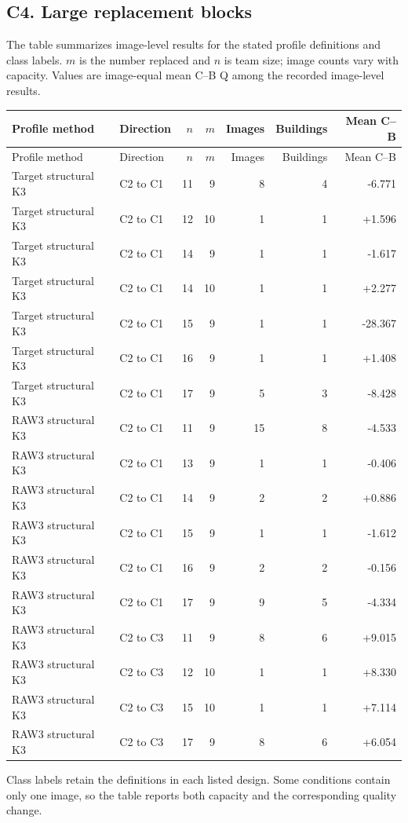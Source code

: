 \documentclass[10pt]{article}
\begin{document}
\subsection*{C4. Large replacement blocks}
The table summarizes image-level results for the stated profile definitions and class labels. $m$ is the number replaced and $n$ is team size; image counts vary with capacity. Values are image-equal mean C--B Q among the recorded image-level results.
\begin{longtable}{llrrrrr}
\toprule Profile method & Direction & $n$ & $m$ & Images & Buildings & Mean C--B \\
\midrule\endfirsthead\toprule Profile method & Direction & $n$ & $m$ & Images & Buildings & Mean C--B \\
\midrule\endhead
Target structural K3 & C2 to C1 & 11 & 9 & 8 & 4 & -6.771 \\
Target structural K3 & C2 to C1 & 12 & 10 & 1 & 1 & +1.596 \\
Target structural K3 & C2 to C1 & 14 & 9 & 1 & 1 & -1.617 \\
Target structural K3 & C2 to C1 & 14 & 10 & 1 & 1 & +2.277 \\
Target structural K3 & C2 to C1 & 15 & 9 & 1 & 1 & -28.367 \\
Target structural K3 & C2 to C1 & 16 & 9 & 1 & 1 & +1.408 \\
Target structural K3 & C2 to C1 & 17 & 9 & 5 & 3 & -8.428 \\
RAW3 structural K3 & C2 to C1 & 11 & 9 & 15 & 8 & -4.533 \\
RAW3 structural K3 & C2 to C1 & 13 & 9 & 1 & 1 & -0.406 \\
RAW3 structural K3 & C2 to C1 & 14 & 9 & 2 & 2 & +0.886 \\
RAW3 structural K3 & C2 to C1 & 15 & 9 & 1 & 1 & -1.612 \\
RAW3 structural K3 & C2 to C1 & 16 & 9 & 2 & 2 & -0.156 \\
RAW3 structural K3 & C2 to C1 & 17 & 9 & 9 & 5 & -4.334 \\
RAW3 structural K3 & C2 to C3 & 11 & 9 & 8 & 6 & +9.015 \\
RAW3 structural K3 & C2 to C3 & 12 & 10 & 1 & 1 & +8.330 \\
RAW3 structural K3 & C2 to C3 & 15 & 10 & 1 & 1 & +7.114 \\
RAW3 structural K3 & C2 to C3 & 17 & 9 & 8 & 6 & +6.054 \\
\bottomrule\end{longtable}
Class labels retain the definitions in each listed design. Some conditions contain only one image, so the table reports both capacity and the corresponding quality change.
\clearpage
\end{document}
